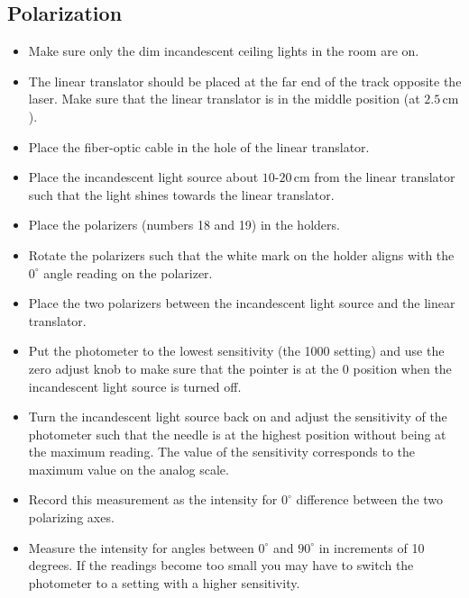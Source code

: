 \subsection{Polarization}
\begin{itemize}
\item Make sure only the dim incandescent ceiling lights in the room are on.

\item The linear translator should be placed at the far end of the track opposite the laser. Make sure that the linear translator is in the middle position (at $2.5\,\mathrm{cm}$).

\item Place the fiber-optic cable in the hole of the linear translator.

\item Place the incandescent light source about $10$-$20\,\mathrm{cm}$ from the linear translator such that the light shines towards the linear translator.

\item Place the polarizers (numbers 18 and 19) in the holders.

\item Rotate the polarizers such that the white mark on the holder aligns with the $0^{\circ}$ angle reading on the polarizer.

\item Place the two polarizers between the incandescent light source and the linear translator.

\item Put the photometer to the lowest sensitivity (the 1000 setting) and use the zero adjust knob to make sure that the pointer is at the 0 position when the incandescent light source is turned off.

\item Turn the incandescent light source back on and adjust the sensitivity of the photometer such that the needle is at the highest position without being at the maximum reading. The value of the sensitivity corresponds to the maximum value on the analog scale.

\item Record this measurement as the intensity for $0^{\circ}$ difference between the two polarizing axes.

\item Measure the intensity for angles between $0^{\circ}$ and $90^{\circ}$ in increments of 10 degrees. If the readings become too small you may have to switch the photometer to a setting with a higher sensitivity.


\end{itemize}
